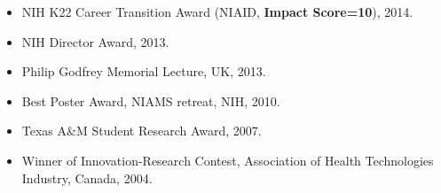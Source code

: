 \documentclass[10pt]{article}
\newenvironment{innerlist}[1][\enskip\textbullet]%
        {\begin{itemize}[#1,leftmargin=*,parsep=0pt,itemsep=0pt,topsep=0pt,partopsep=0pt]}
        {\end{itemize}}
\begin{document}
\begin{innerlist}
\item NIH K22 Career Transition Award (NIAID, {\textbf{Impact Score=10}}), 2014.
\vspace{0.1in}
\item NIH Director Award, 2013.
\vspace{0.1in}
\item  Philip Godfrey Memorial Lecture, UK, 2013.
\vspace{0.1in}
\item Best Poster Award, NIAMS retreat, NIH, 2010.
\vspace{0.1in}
\item Texas A\&M Student Research Award, 2007.
\vspace{0.1in}
\item  Winner of Innovation-Research Contest, Association of Health Technologies Industry, Canada, 2004.

\end{innerlist}
\end{document}
